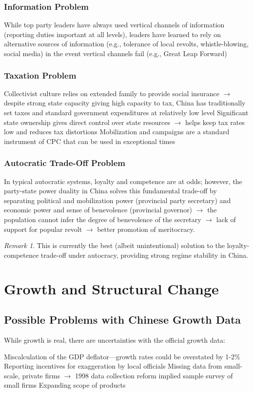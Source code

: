 \documentclass[11pt]{article}
\theoremstyle{definition}
\theoremstyle{remark}
\newtheorem*{remark}{Remark}
\begin{document}
\subsubsection{Information Problem}
While top party leaders have always used vertical channels of information (reporting duties important at all levels), leaders have learned to rely on alternative sources of information (e.g., tolerance of local revolts, whistle-blowing, social media) in the event vertical channels fail (e.g., Great Leap Forward)

\subsubsection{Taxation Problem}
\begin{outline}[enumerate]
\1 Collectivist culture relies on extended family to provide social insurance $\to$ despite strong state capacity giving high capacity to tax, China has traditionally set taxes and standard government expenditures at relatively low level
\1 Significant state ownership gives direct control over state resources $\to$ helps keep tax rates low and reduces tax distortions
\1 Mobilization and campaigns are a standard instrument of CPC that can be used in exceptional times
\end{outline}

\subsubsection{Autocratic Trade-Off Problem}
In typical autocratic systems, loyalty and competence are at odds; however, the party-state power duality in China solves this fundamental trade-off by separating political and mobilization power (provincial party secretary) and economic power and sense of benevolence (provincial governor) $\to$ the population cannot infer the degree of benevolence of the secretary $\to$ lack of support for popular revolt $\to$ better promotion of meritocracy.

\begin{remark}
This is currently the best (albeit unintentional) solution to the loyalty-competence trade-off under autocracy, providing strong regime stability in China.
\end{remark}
\clearpage

\section{Growth and Structural Change}
\subsection{Possible Problems with Chinese Growth Data}
While growth is real, there are uncertainties with the official growth data:
\begin{outline}[enumerate]
\1 Miscalculation of the GDP deflator---growth rates could be overstated by 1-2\%
\1 Reporting incentives for exaggeration by local officials
\1 Missing data from small-scale, private firms $\to$ 1998 data collection reform implied sample survey of small firms
\1 Expanding scope of products
\end{outline}
\end{document}
